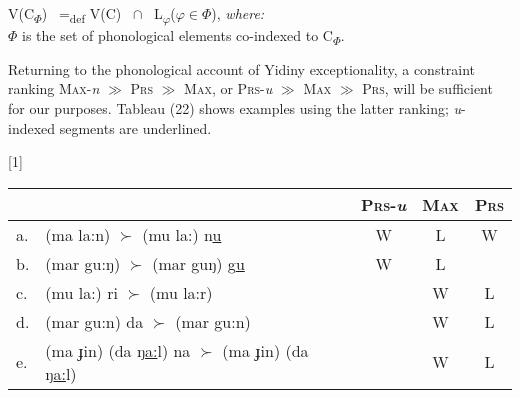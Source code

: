 \documentclass[output=paper,
modfonts
]{LSP/langsci}
\begin{document}
\ea
V(\textsc{C}\textsubscript{$\Phi $}) \ =\textsubscript{def} V(\textsc{C}) \ ${\cap}$ \ L\textsubscript{$\varphi $}($\varphi $${\in}$$\Phi $), \textit{where:} \\
$\Phi $\textsc{} is the set of phonological elements co-indexed to C\textsubscript{$\Phi $}.
\z

Returning to the phonological account of Yidiny exceptionality, a constraint ranking \textsc{Max-}\textit{n}\textsc{} \textsc{${\gg}$} \textsc{Prs} \textsc{${\gg}$} \textsc{Max}, or \textsc{Prs}\textsc{{}-}\textit{u}\textsc{} \textsc{${\gg}$} \textsc{Max} \textsc{${\gg}$} \textsc{Prs}, will be sufficient for our purposes. Tableau (22) shows examples using the latter ranking; \textit{u}{}-indexed segments are underlined.

\ea
\renewcommand*\arraystretch{1.2}
\scalebox{1}[1]{\begin{tabular}[t]{|ll||c|c|c|}
\firsthline
 & & \textsc{Prs}-\textit{u} & \textsc{Max} & \textsc{Prs} \\
\hline
\hline
a. & (ma la:n) ${\succ}$ (mu la:) n\underline{u} & W & L&W\\
\hline
b. & (mar gu:ŋ) ${\succ}$ (mar guŋ) g\underline{u} & W & L &\\
\hline
c. & (mu la:) ri ${\succ}$ (mu la:r) & & W & L\\
\hline
d. & (mar gu:n) da ${\succ}$ (mar gu:n) & & W & L\\
\hline
e. & (ma ɟin) (da ŋ\underline{a:}l) na ${\succ}$ (ma ɟin) (da ŋ\underline{a:}l) & & W & L\\
\hline
\end{tabular}}\renewcommand*\arraystretch{1}
\z
\end{document}
